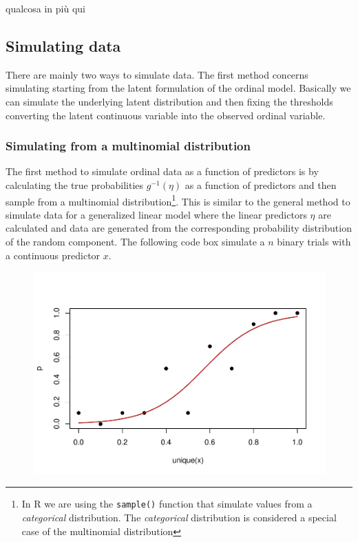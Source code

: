 \documentclass[
  man,floatsintext]{apa6}
\begin{document}
qualcosa in più qui

\subsection{Simulating data}\label{simulating-data}

There are mainly two ways to simulate data. The first method concerns simulating starting from the latent formulation of the ordinal model. Basically we can simulate the underlying latent distribution and then fixing the thresholds converting the latent continuous variable into the observed ordinal variable.

\subsubsection{Simulating from a multinomial distribution}\label{simulating-from-a-multinomial-distribution}

The first method to simulate ordinal data as a function of predictors is by calculating the true probabilities \(g^{-1}(\eta)\) as a function of predictors and then sample from a multinomial distribution\footnote{In R we are using the \texttt{sample()} function that simulate values from a \emph{categorical} distribution. The \emph{categorical} distribution is considered a special case of the multinomial distribution}. This is similar to the general method to simulate data for a generalized linear model where the linear predictors \(\eta\) are calculated and data are generated from the corresponding probability distribution of the random component. The following code box simulate a \(n\) binary trials with a continuous predictor \(x\).

\scriptsize

\begin{figure}

{\centering \includegraphics{paper-new_files/figure-latex/unnamed-chunk-6-1} 

}

\caption{ }\label{fig:unnamed-chunk-6}
\end{figure}
\end{document}
